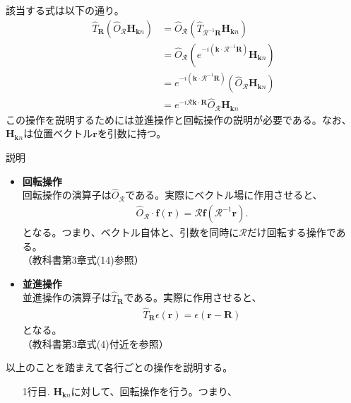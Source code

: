 \documentclass[a4paper,11pt,dvipdfmx]{jsarticle}
\begin{document}
\begin{enumerate}
    該当する式は以下の通り。
    \begin{align*}
      \hat{T}_{\mathbf{R}}\left( \hat{O}_\mathcal{R} \mathbf{H}_{\mathbf{k}n} \right) &= \hat{O}_\mathcal{R} \left( \hat{T}_{\mathcal{R}^{-1}\mathbf{R}}\mathbf{H}_{\mathbf{k}n} \right) 
      \\
      &= \hat{O}_\mathcal{R} \left( e^{-i\left( \mathbf{k}\cdot \mathcal{R}^{-1}\mathbf{R} \right)}  \mathbf{H}_{\mathbf{k}n }\right)
      \\
      &= e^{-i \left( \mathbf{k} \cdot \mathcal{R}^{-1}\mathbf{R} \right) }\left( \hat{O}_\mathcal{R} \mathbf{H}_{\mathbf{k}n} \right)
      \\
      &= e^{-i \mathcal{R} \mathbf{k \cdot R}}\hat{O}_{\mathcal{R}} \mathbf{H}_{\mathbf{k}n}
    \end{align*}
    この操作を説明するためには並進操作と回転操作の説明が必要である。なお、$\mathbf{H}_{\mathbf{k}n}$は位置ベクトル$\mathbf{r}$を引数に持つ。
    \begin{itembox}[l]{説明}
      \begin{itemize}
        \item \textbf{回転操作}\\
        回転操作の演算子は$\hat{O}_{\mathcal{R}}$である。実際にベクトル場に作用させると、
        \begin{align*}
          \hat{O}_{\mathcal{R}} \cdot \mathbf{f(r)} = \mathcal{R}\mathbf{f}(\mathcal{R}^{-1}\mathbf{r}).
        \end{align*}
        となる。つまり、ベクトル自体と、引数を同時に$\mathcal{R}$だけ回転する操作である。
        \\
        （教科書第3章式(14)参照）
        \item \textbf{並進操作}\\
        並進操作の演算子は$\hat{T}_{\mathbf{R}}$である。実際に作用させると、
        \begin{align*}
          \hat{T}_{\mathbf{R}} \epsilon(\mathbf{r}) = \epsilon(\mathbf{r} - \mathbf{R})
        \end{align*}
        となる。
        \\
        （教科書第3章式(4)付近を参照）
      \end{itemize}
    \end{itembox}
    以上のことを踏まえて各行ごとの操作を説明する。
    \begin{itemize}
      \item[1行目.] $\mathbf{H}_{\mathbf{k}n}$に対して、回転操作を行う。つまり、
      \begin{align*}

\end{align*}
\end{itemize}
\end{enumerate}
\end{document}
